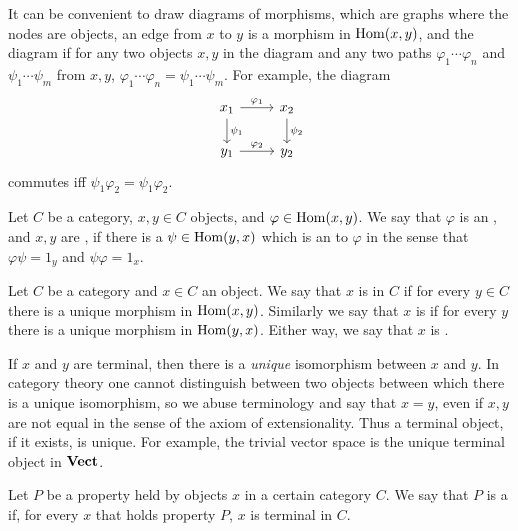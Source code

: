 \begin{subsec}
It can be convenient to draw diagrams of morphisms, which are graphs where the nodes are objects, an edge from $x$ to $y$ is a morphism in $\operatorname{Hom}(x, y)$, and the diagram  if for any two objects $x, y$ in the diagram and any two paths $\varphi_1\cdots\varphi_{n}$ and $\psi_1\cdots\psi_{m}$ from $x, y$, $\varphi_1\cdots\varphi_{n} = \psi_1\cdots\psi_{m}$.
For example, the diagram
$$\begin{tikzcd}
x_1 \arrow[r,"\varphi_1"] \arrow[d,"\psi_1"] & x_2 \arrow[d,"\psi_2"]\\
y_1 \arrow[r,"\varphi_2"] & y_2
\end{tikzcd}$$
commutes iff $\psi_1\varphi_2 = \psi_1\varphi_2$.
\end{subsec}

\begin{definition}
Let $C$ be a category, $x,y \in C$ objects, and $\varphi \in \operatorname{Hom}(x, y)$.
We say that $\varphi$ is an , and $x,y$ are , if there is a $\psi \in \operatorname{Hom}(y, x)$ which is an  to $\varphi$ in the sense that $\varphi\psi = 1_y$ and $\psi\varphi = 1_x$.
\end{definition}

\begin{definition}
Let $C$ be a category and $x \in C$ an object.
We say that $x$ is  in $C$ if for every $y \in C$ there is a unique morphism in $\operatorname{Hom}(x, y)$.
Similarly we say that $x$ is  if for every $y$ there is a unique morphism in $\operatorname{Hom}(y, x)$.
Either way, we say that $x$ is .
\end{definition}

\begin{subsec}
If $x$ and $y$ are terminal, then there is a \emph{unique} isomorphism between $x$ and $y$.
In category theory one cannot distinguish between two objects between which there is a unique isomorphism, so we abuse terminology and say that $x = y$, even if $x,y$ are not equal in the sense of the axiom of extensionality.
Thus a terminal object, if it exists, is unique.
For example, the trivial vector space is the unique terminal object in $\mathbf{Vect}$.
\end{subsec}

\begin{definition}
Let $P$ be a property held by objects $x$ in a certain category $C$.
We say that $P$ is a  if, for every $x$ that holds property $P$, $x$ is terminal in $C$.
\end{definition}

